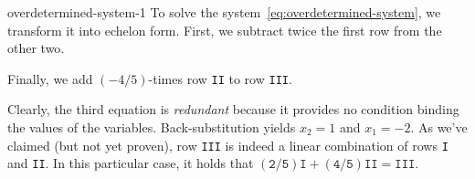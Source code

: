 \begin{example}{}{overdetermined-system-1}
 To solve the system~\eqref{eq:overdetermined-system}, we transform it into
 echelon form. First, we subtract twice the first row from the other two.
 \begin{center}
 \end{center}
 Finally, we add $(-4 / 5)$-times row \texttt{II} to row \texttt{III}.
 \begin{center}
 \end{center}
 Clearly, the third equation is \emph{redundant} because it provides no
 condition binding the values of the variables. Back-substitution yields $x_2 =
 1$ and $x_1 = -2$. As we've claimed (but not yet proven), row \texttt{III} is
 indeed a linear combination of rows \texttt{I} and \texttt{II}. In this
 particular case, it holds that $\mathtt{(2 / 5)I + (4 / 5)II = III}$.
\end{example}

